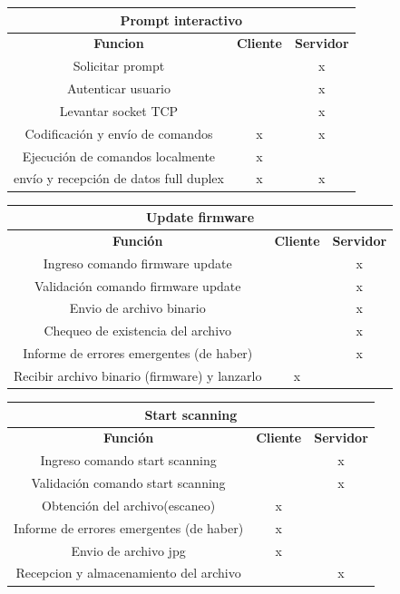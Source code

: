 \documentclass[fontsize=12pt]{article}
\begin{document}
\begin{table}[H]
\centering
\begin{tabular}{ |c|c|c| }
 \hline
  \multicolumn{3}{|c|}{\textbf{Prompt interactivo}}\\
  \hline 
\textbf{Funcion}&\textbf{Cliente} & \textbf{Servidor}\\
 \hline 
 Solicitar prompt &&x\\
 Autenticar usuario &&x\\
 Levantar socket TCP&&x\\
 Codificación y envío de comandos&x&x\\
 Ejecución de comandos localmente&x&\\
 envío y recepción de datos full duplex&x&x\\
  \hline
\end{tabular}
\bigskip \bigskip \bigskip
\end{table}


\begin{table}[H]
\centering
\begin{tabular}{ |c|c|c| }
 \hline
  \multicolumn{3}{|c|}{\textbf{Update firmware}}\\
  \hline 
\textbf{Función}&\textbf{Cliente} & \textbf{Servidor}\\
 \hline 
Ingreso comando firmware update &&x\\
 Validación comando firmware update &&x\\
 Envio de archivo binario &&x\\
 Chequeo de existencia del archivo &&x\\
 Informe de errores emergentes (de haber) &&x\\
 Recibir archivo binario (firmware) y lanzarlo &x&\\
  \hline
\end{tabular}
\bigskip \bigskip \bigskip
\end{table}

\begin{table}[H]
\centering
\begin{tabular}{ |c|c|c| }
 \hline
  \multicolumn{3}{|c|}{\textbf{Start scanning}}\\
  \hline 
\textbf{Función}&\textbf{Cliente} & \textbf{Servidor}\\
 \hline 
Ingreso comando start scanning &&x\\
 Validación comando  start scanning &&x\\
Obtención del archivo(escaneo) &x&\\
 Informe de errores emergentes (de haber) &x&\\
 Envio de archivo jpg &x&\\
 Recepcion y almacenamiento del archivo &&x\\
  \hline
\end{tabular}
\bigskip \bigskip \bigskip
\end{table}
\end{document}
